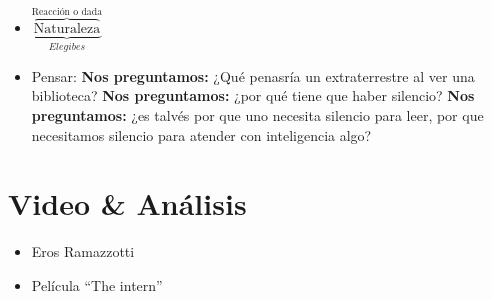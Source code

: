 \begin{itemize}
\begin{enumerate}
\begin{itemize}
                    \item $\underbrace{\overbrace{\text{Naturaleza}}^{\text{Reacción o dada}}}_{Elegibes}$
                    \item Pensar: \textbf{Nos preguntamos:} ¿Qué penasría un extraterrestre al ver una biblioteca? \textbf{Nos preguntamos:} ¿por qué tiene que haber silencio? \textbf{Nos preguntamos:} ¿es talvés por que uno necesita silencio para leer, por que necesitamos silencio para atender con inteligencia algo?
                \end{itemize}
        \end{enumerate}
\end{itemize}


\section{Video \& Análisis}
\begin{itemize}
    \item Eros Ramazzotti 
    \item Película ``The intern''
\end{itemize}


